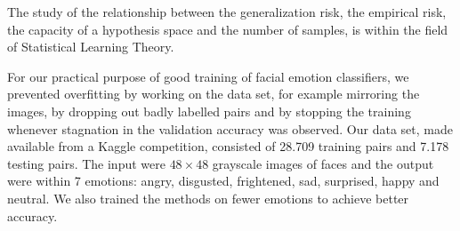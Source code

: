 The study of the relationship between the generalization risk, the empirical risk, the capacity of a hypothesis space and the number of samples, is within the field of Statistical Learning Theory. 

For our practical purpose of good training of facial emotion classifiers, we prevented overfitting by working on the data set, for example mirroring the images, by dropping out badly labelled pairs and by stopping the training whenever stagnation in the validation accuracy was observed. Our data set, made available from a Kaggle competition, consisted of 28.709 training pairs and 7.178 testing pairs. The input were $48 \times 48$ grayscale images of faces and the output were within 7 emotions: angry, disgusted, frightened, sad, surprised, happy and neutral. We also trained the methods on fewer emotions to achieve better accuracy. 


\newpage